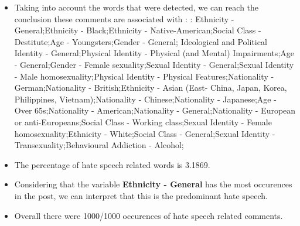 \documentclass[11pt]{article}
\begin{document}
\begin{itemize}\item Taking into account the words that were detected, we can reach the conclusion these comments are associated with : : Ethnicity - General;Ethnicity - Black;Ethnicity - Native-American;Social Class - Destitute;Age - Youngsters;Gender - General; Ideological and Political Identity - General;Physical Identity - Physical (and Mental) Impairments;Age - General;Gender - Female sexuality;Sexual Identity - General;Sexual Identity - Male homosexuality;Physical Identity - Physical Features;Nationality - German;Nationality - British;Ethnicity - Asian (East- China, Japan, Korea, Philippines, Vietnam);Nationality - Chinese;Nationality - Japanese;Age - Over 65s;Nationality - American;Nationality - General;Nationality - European or anti-Europeans;Social Class - Working class;Sexual Identity - Female homosexuality;Ethnicity - White;Social Class - General;Sexual Identity - Transexuality;Behavioural Addiction - Alcohol;%

\item The percentage of hate speech related words is 3.1869.

\item Considering that the variable \textbf{Ethnicity - General} has the most occurences in the post, we can interpret that this is the predominant hate speech.

\item Overall there were 1000/1000 occurences of hate speech related comments.\end{itemize}
\end{document}
